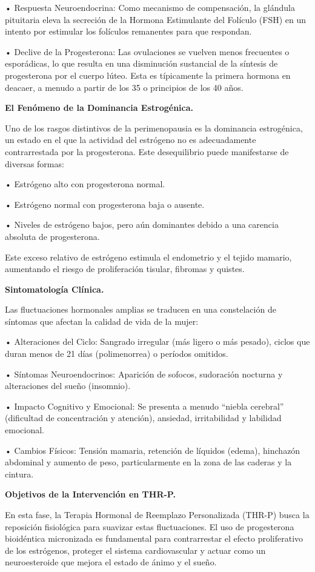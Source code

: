 \documentclass[
  spanish,
]{article}
\begin{document}
• Respuesta Neuroendocrina: Como mecanismo de compensación, la glándula pituitaria eleva la secreción de la Hormona Estimulante del Folículo (FSH) en un intento por estimular los folículos remanentes para que respondan.

• Declive de la Progesterona: Las ovulaciones se vuelven menos frecuentes o esporádicas, lo que resulta en una disminución sustancial de la síntesis de progesterona por el cuerpo lúteo. Esta es típicamente la primera hormona en deacaer, a menudo a partir de los 35 o principios de los 40 años.

\textbf{El Fenómeno de la Dominancia Estrogénica.}

Uno de los rasgos distintivos de la perimenopausia es la dominancia estrogénica, un estado en el que la actividad del estrógeno no es adecuadamente contrarrestada por la progesterona. Este desequilibrio puede manifestarse de diversas formas:

• Estrógeno alto con progesterona normal.

• Estrógeno normal con progesterona baja o ausente.

• Niveles de estrógeno bajos, pero aún dominantes debido a una carencia absoluta de progesterona.

Este exceso relativo de estrógeno estimula el endometrio y el tejido mamario, aumentando el riesgo de proliferación tisular, fibromas y quistes.

\textbf{Sintomatología Clínica.}

Las fluctuaciones hormonales amplias se traducen en una constelación de síntomas que afectan la calidad de vida de la mujer:

• Alteraciones del Ciclo: Sangrado irregular (más ligero o más pesado), ciclos que duran menos de 21 días (polimenorrea) o períodos omitidos.

• Síntomas Neuroendocrinos: Aparición de sofocos, sudoración nocturna y alteraciones del sueño (insomnio).

• Impacto Cognitivo y Emocional: Se presenta a menudo ``niebla cerebral'' (dificultad de concentración y atención), ansiedad, irritabilidad y labilidad emocional.

• Cambios Físicos: Tensión mamaria, retención de líquidos (edema), hinchazón abdominal y aumento de peso, particularmente en la zona de las caderas y la cintura.

\textbf{Objetivos de la Intervención en THR-P.}

En esta fase, la Terapia Hormonal de Reemplazo Personalizada (THR-P) busca la reposición fisiológica para suavizar estas fluctuaciones. El uso de progesterona bioidéntica micronizada es fundamental para contrarrestar el efecto proliferativo de los estrógenos, proteger el sistema cardiovascular y actuar como un neuroesteroide que mejora el estado de ánimo y el sueño.
\end{document}
